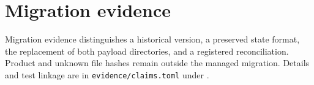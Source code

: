 \section{Migration evidence}
\label{app:migration-evidence}

Migration evidence distinguishes a historical version, a preserved state format, the
replacement of both payload directories, and a registered reconciliation. Product and
unknown file hashes remain outside the managed migration. Details and test linkage are in
\texttt{evidence/claims.toml} under .

